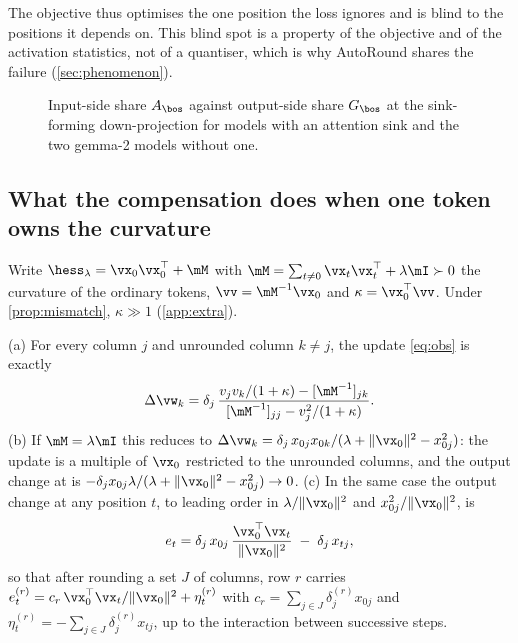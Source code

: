 The objective thus optimises the one position the loss ignores and is blind to the positions it depends on.
This blind spot is a property of the objective and of the activation statistics, not of a quantiser, which is why AutoRound shares the failure (\cref{sec:phenomenon}).
\begin{figure}[t]
\begin{center}
\end{center}
\caption{Input-side share $A_{\bos}$ against output-side share $G_{\bos}$ at the sink-forming down-projection for \nSink{} models with an attention sink and the two gemma-2 models without one. }
\label{fig:ag}
\end{figure}

\subsection{What the compensation does when one token owns the curvature}
\label{sec:mechanism:rankone}
Write $\hess_\lambda=\vx_0\vx_0^\top+\mM$ with $\mM=\sum_{t\ne0}\vx_t\vx_t^\top+\lambda\mI\succ0$ the curvature of the ordinary tokens, $\vv=\mM^{-1}\vx_0$ and $\kappa=\vx_0^\top\vv$.
Under \cref{prop:mismatch}, $\kappa\gg1$ (\cref{app:extra}).
\begin{theorem}
\label{thm:rankone}
(a) For every column $j$ and unrounded column $k\ne j$, the update \cref{eq:obs} is exactly
\begin{equation}
\label{eq:exact}
\Delta\vw_k=\delta_j\,\frac{v_jv_k/(1+\kappa)-[\mM^{-1}]_{jk}}{[\mM^{-1}]_{jj}-v_j^2/(1+\kappa)} .
\end{equation}
(b) If $\mM=\lambda\mI$ this reduces to $\Delta\vw_k=\delta_j\,x_{0j}x_{0k}/(\lambda+\|\vx_0\|^2-x_{0j}^2)$: the update is a multiple of $\vx_0$ restricted to the unrounded columns, and the output change at \bos{} is $-\delta_jx_{0j}\lambda/(\lambda+\|\vx_0\|^2-x_{0j}^2)\to0$.
(c) In the same case the output change at any position $t$, to leading order in $\lambda/\|\vx_0\|^2$ and $x_{0j}^2/\|\vx_0\|^2$, is
\begin{equation}
\label{eq:error}
e_t=\delta_j\,x_{0j}\,\frac{\vx_0^\top\vx_t}{\|\vx_0\|^2}\;-\;\delta_j\,x_{tj},
\end{equation}
so that after rounding a set $J$ of columns, row $r$ carries $e^{(r)}_t=c_r\,\vx_0^\top\vx_t/\|\vx_0\|^2+\eta^{(r)}_t$ with $c_r=\sum_{j\in J}\delta^{(r)}_jx_{0j}$ and $\eta^{(r)}_t=-\sum_{j\in J}\delta^{(r)}_jx_{tj}$, up to the interaction between successive steps.
\end{theorem}
